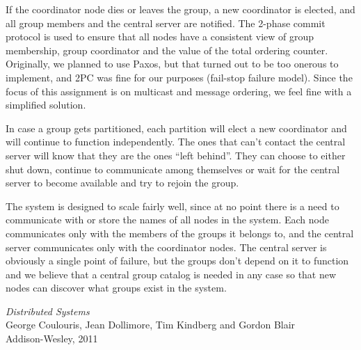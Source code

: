 \documentclass[10pt, oneside]{article}
\begin{document}
If the coordinator node dies or leaves the group, a new coordinator is elected,
and all group members and the central server are notified. The 2-phase commit
protocol is used to ensure that all nodes have a consistent view of group
membership, group coordinator and the value of the total ordering
counter. Originally, we planned to use Paxos, but that turned out to be too
onerous to implement, and 2PC was fine for our purposes (fail-stop failure
model). Since the focus of this assignment is on multicast and message ordering,
we feel fine with a simplified solution.

In case a group gets partitioned, each partition will elect a new coordinator
and will continue to function independently. The ones that can't contact the
central server will know that they are the ones ``left behind''. They can choose
to either shut down, continue to communicate among themselves or wait for the
central server to become available and try to rejoin the group.

The system is designed to scale fairly well, since at no point there is a need
to communicate with or store the names of all nodes in the system. Each node
communicates only with the members of the groups it belongs to, and the central
server communicates only with the coordinator nodes. The central server is
obviously a single point of failure, but the groups don't depend on it to
function and we believe that a central group catalog is needed in any case so
that new nodes can discover what groups exist in the system.

\pagebreak

\begin{thebibliography}{9}

 \emph{Distributed Systems}\\
\newblock George Coulouris, Jean Dollimore, Tim Kindberg and Gordon Blair\\
\newblock Addison-Wesley, 2011\\

\end{thebibliography}
\end{document}
